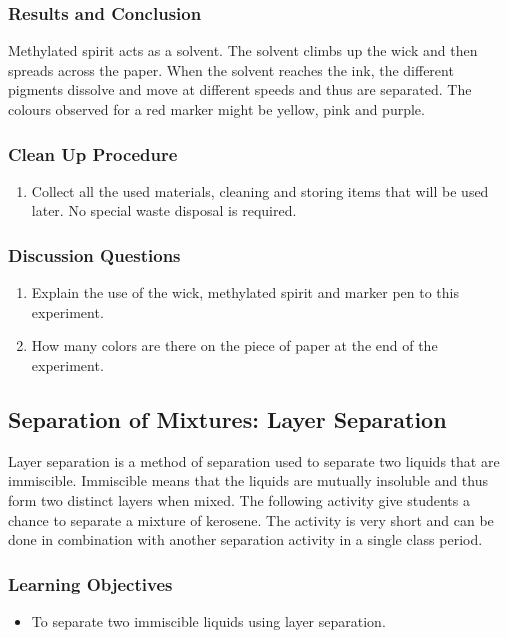 \subsubsection*{Results and Conclusion}
Methylated spirit acts as a solvent. The solvent climbs up the wick and then spreads across the paper.  When the solvent reaches the ink, the different pigments dissolve and move at different speeds and thus are separated. The colours observed for a red marker might be yellow, pink and purple.

\subsubsection*{Clean Up Procedure}
\begin{enumerate}
\item{Collect all the used materials, cleaning and storing items that will be used later. No special waste disposal is required.}
\end{enumerate}

\subsubsection*{Discussion Questions}
\begin{enumerate}
\item{Explain the use of the wick, methylated spirit and marker pen to this experiment.}
\item{How many colors are there on the piece of paper at the end of the experiment.}
\end{enumerate}


\subsection{Separation of Mixtures: Layer Separation}
Layer separation is a method of separation used to separate two liquids that are immiscible. Immiscible means that the liquids are mutually insoluble and thus form two distinct layers when mixed. The following activity give students a chance to separate a mixture of kerosene. The activity is very short and can be done in combination with another separation activity in a single class period.

\subsubsection*{Learning Objectives}
\begin{itemize}
\item{To separate two immiscible liquids using layer separation.}
\end{itemize}

